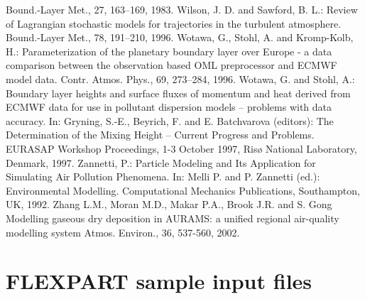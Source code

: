 \documentclass{egu}                  %
\begin{document}
\begin{thebibliography}{}
Bound.-Layer Met., 27, 163--169, 1983.
Wilson, J. D. and Sawford, B. L.:
Review of Lagrangian stochastic models for trajectories in the turbulent atmosphere.
Bound.-Layer Met., 78, 191--210, 1996.
Wotawa, G., Stohl, A. and Kromp-Kolb, H.:
Parameterization of the planetary boundary layer over Europe - a data comparison between the observation based OML preprocessor and ECMWF model data.
Contr. Atmos. Phys., 69, 273--284, 1996.
Wotawa, G. and Stohl, A.:
Boundary layer heights and surface fluxes of momentum and heat derived from ECMWF data for use in pollutant dispersion models -- problems with data accuracy.
In: Gryning, S.-E., Beyrich, F. and E. Batchvarova (editors): The Determination of the Mixing Height -- Current Progress and Problems. EURASAP Workshop Proceedings, 1-3 October 1997, Ris{\o} National Laboratory, Denmark, 1997.
Zannetti, P.:
Particle Modeling and Its Application for Simulating Air Pollution Phenomena. In: Melli P. and P. Zannetti (ed.): Environmental Modelling. Computational Mechanics Publications, Southampton, UK, 1992.
Zhang L.M., Moran M.D., Makar P.A., Brook J.R. and S. Gong
Modelling gaseous dry deposition in AURAMS: a unified regional air-quality modelling system 
Atmos. Environ., 36, 537-560, 2002.

\end{thebibliography}

\newpage

\appendix

\onecolumn

\section{FLEXPART sample input files}
\end{document}

